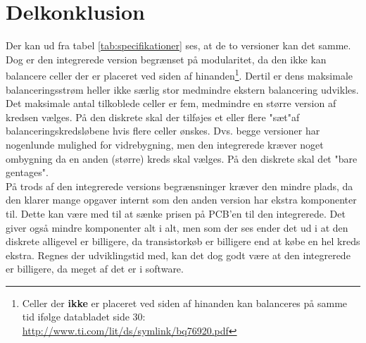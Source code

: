 \section{Delkonklusion}
Der kan ud fra tabel \ref{tab:specifikationer} ses, at de to versioner kan det samme. Dog er den integrerede version begrænset på modularitet, da den ikke kan balancere celler der er placeret ved siden af hinanden\footnote{Celler der \textbf{ikke} er placeret ved siden af hinanden kan balanceres på samme tid ifølge databladet side 30: \url{http://www.ti.com/lit/ds/symlink/bq76920.pdf}}. Dertil er dens maksimale balanceringsstrøm heller ikke særlig stor medmindre ekstern balancering udvikles. \\

Det maksimale antal tilkoblede celler er fem, medmindre en større version af kredsen vælges. På den diskrete skal der tilføjes et eller flere "sæt"\space af balanceringskredsløbene hvis flere celler ønskes. Dvs. begge versioner har nogenlunde mulighed for vidrebygning, men den integrerede kræver noget ombygning da en anden (større) kreds skal vælges. På den diskrete skal det "bare gentages".\\

På trods af den integrerede versions begrænsninger kræver den mindre plads, da den klarer mange opgaver internt som den anden version har ekstra komponenter til. Dette kan være med til at sænke prisen på PCB'en til den integrerede. Det giver også mindre komponenter alt i alt, men som der ses ender det ud i at den diskrete alligevel er billigere, da transistorkøb er billigere end at købe en hel kreds ekstra. Regnes der udviklingstid med, kan det dog godt være at den integrerede er billigere, da meget af det er i software. \\